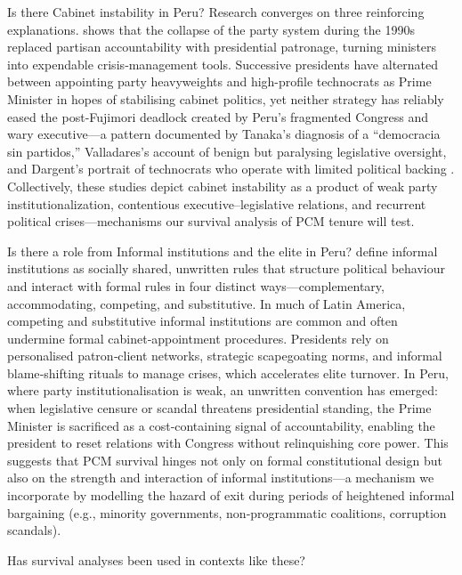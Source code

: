 \documentclass[a4paper, 12pt]{article}
\begin{document}
Is there Cabinet instability in Peru? Research converges on three reinforcing explanations. 
\citet{levitsky_latin_1999} shows that the collapse of the party system during the 1990s replaced partisan accountability with presidential patronage, turning ministers into expendable crisis‑management tools. Successive presidents have alternated between appointing party heavyweights and high-profile technocrats as Prime Minister in hopes of stabilising cabinet politics, yet neither strategy has reliably eased the post-Fujimori deadlock created by Peru’s fragmented Congress and wary executive—a pattern documented by Tanaka’s diagnosis of a “democracia sin partidos,” Valladares’s account of benign but paralysing legislative oversight, and Dargent’s portrait of technocrats who operate with limited political backing \citep{tanaka_democracia_2005,valladares_horror_2012, dargent_technocracy_2014}. Collectively, these studies depict cabinet instability as a product of weak party institutionalization, contentious executive–legislative relations, and recurrent political crises—mechanisms our survival analysis of PCM tenure will test.

Is there a role from Informal institutions and the elite in Peru?\citet{helmke_informal_2004} define informal institutions as socially shared, unwritten rules that structure political behaviour and interact with formal rules in four distinct ways—complementary, accommodating, competing, and substitutive. In much of Latin America, competing and substitutive informal institutions are common and often undermine formal cabinet‑appointment procedures. Presidents rely on personalised patron‑client networks, strategic scapegoating norms, and informal blame‑shifting rituals to manage crises, which accelerates elite turnover. In Peru, where party institutionalisation is weak, an unwritten convention has emerged: when legislative censure or scandal threatens presidential standing, the Prime Minister is sacrificed as a cost‑containing signal of accountability, enabling the president to reset relations with Congress without relinquishing core power. This suggests that PCM survival hinges not only on formal constitutional design but also on the strength and interaction of informal institutions—a mechanism we incorporate by modelling the hazard of exit during periods of heightened informal bargaining (e.g., minority governments, non‑programmatic coalitions, corruption scandals). 

Has survival analyses been used in contexts like these? 
\end{document}
